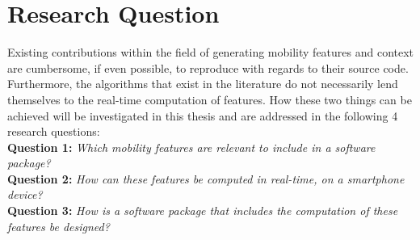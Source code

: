 \section{Research Question}

Existing contributions within the field of generating mobility features and context are cumbersome, if even possible, to reproduce with regards to their source code. Furthermore, the algorithms that exist in the literature do not necessarily lend themselves to the real-time computation of features. How these two things can be achieved will be investigated in this thesis and are addressed in the following 4 research questions:\\

\textbf{Question 1:} \textit{Which mobility features are relevant to include in a software package?}\\

\textbf{Question 2:} \textit{How can these features be computed in real-time, on a smartphone device?}\\

\textbf{Question 3:} \textit{How is a software package that includes the computation of these features be designed?}\\
